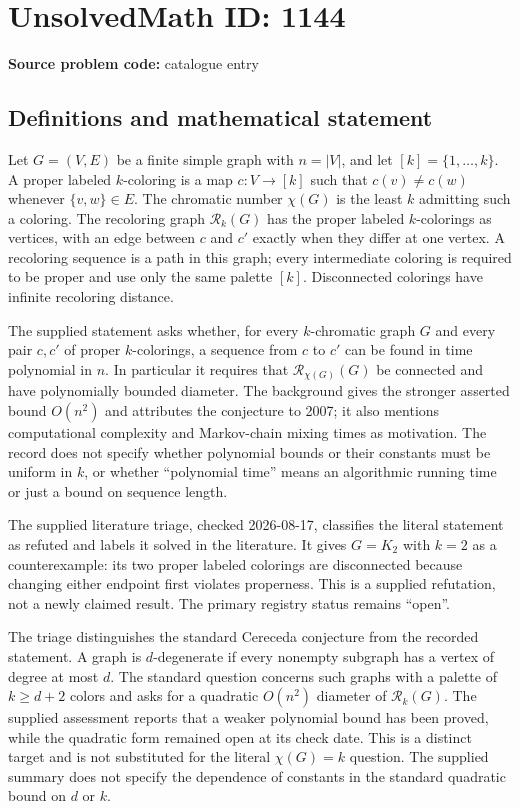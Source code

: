 \documentclass[11pt]{article}
\begin{document}
\section*{UnsolvedMath ID: 1144}
\textbf{Source problem code:} catalogue entry
\subsection{Definitions and mathematical statement}
Let $G=(V,E)$ be a finite simple graph with $n=|V|$, and let $[k]=\{1,\ldots,k\}$. A proper labeled $k$-coloring is a map $c:V\to[k]$ such that $c(v)\ne c(w)$ whenever $\{v,w\}\in E$. The chromatic number $\chi(G)$ is the least $k$ admitting such a coloring. The recoloring graph $\mathcal R_k(G)$ has the proper labeled $k$-colorings as vertices, with an edge between $c$ and $c'$ exactly when they differ at one vertex. A recoloring sequence is a path in this graph; every intermediate coloring is required to be proper and use only the same palette $[k]$. Disconnected colorings have infinite recoloring distance.

The supplied statement asks whether, for every $k$-chromatic graph $G$ and every pair $c,c'$ of proper $k$-colorings, a sequence from $c$ to $c'$ can be found in time polynomial in $n$. In particular it requires that $\mathcal R_{\chi(G)}(G)$ be connected and have polynomially bounded diameter. The background gives the stronger asserted bound $O(n^2)$ and attributes the conjecture to 2007; it also mentions computational complexity and Markov-chain mixing times as motivation. The record does not specify whether polynomial bounds or their constants must be uniform in $k$, or whether ``polynomial time'' means an algorithmic running time or just a bound on sequence length.

The supplied literature triage, checked 2026-08-17, classifies the literal statement as refuted and labels it solved in the literature. It gives $G=K_2$ with $k=2$ as a counterexample: its two proper labeled colorings are disconnected because changing either endpoint first violates properness. This is a supplied refutation, not a newly claimed result. The primary registry status remains ``open''.

The triage distinguishes the standard Cereceda conjecture from the recorded statement. A graph is $d$-degenerate if every nonempty subgraph has a vertex of degree at most $d$. The standard question concerns such graphs with a palette of $k\geq d+2$ colors and asks for a quadratic $O(n^2)$ diameter of $\mathcal R_k(G)$. The supplied assessment reports that a weaker polynomial bound has been proved, while the quadratic form remained open at its check date. This is a distinct target and is not substituted for the literal $\chi(G)=k$ question. The supplied summary does not specify the dependence of constants in the standard quadratic bound on $d$ or $k$.
\end{document}
